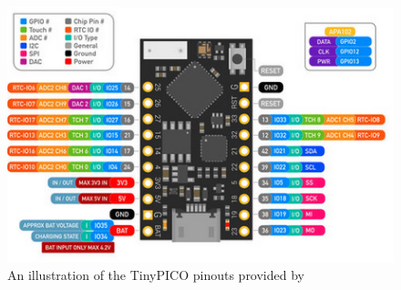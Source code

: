 \begin{figure}[H]
	\centering
	\captionsetup{width=1.0\linewidth}


	\includegraphics[width=1.0\linewidth]{graphics/tinypico_pinouts.png}

	\caption[TinyPICO Pinouts]{An illustration of the TinyPICO pinouts provided by \cite{tinypico}}

	\label{fig:tinypico_pinouts}

\end{figure}